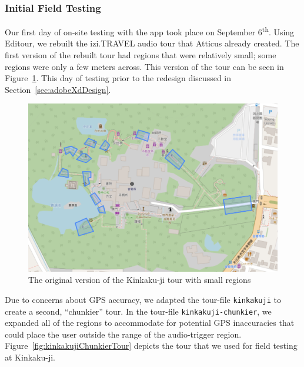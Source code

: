 \documentclass[a4paper, 10pt, american, titlepage]{article}
\begin{document}
\subsubsection{Initial Field Testing}
\label{sec:initialFieldTesting}

Our first day of on-site testing with the app took place on September
6\textsuperscript{th}. Using Editour, we rebuilt the izi.TRAVEL audio tour that
Atticus already created. The first version of the rebuilt tour had regions that
were relatively small; some regions were only a few meters across. This version
of the tour can be seen in Figure~\ref{fig:kinkakujiTour}. This day of testing
prior to the redesign discussed in Section~\ref{sec:adobeXdDesign}.

\begin{figure}[h]
	\centering
	\includegraphics[width=\textwidth]{kinkakuji-tour.png}
	\caption[The original version of the Kinkaku-ji tour]{The original version
		of the Kinkaku-ji tour with small regions}
	\label{fig:kinkakujiTour}
\end{figure}

Due to concerns about GPS accuracy, we adapted the tour-file \texttt{kinkakuji}
to create a second, ``chunkier'' tour.  In the tour-file
\texttt{kinkakuji-chunkier}, we expanded all of the regions to accommodate for
potential GPS inaccuracies that could place the user outside the range of the
audio-trigger region.  Figure~\ref{fig:kinkakujiChunkierTour} depicts the tour
that we used for field testing at Kinkaku-ji.
\end{document}
